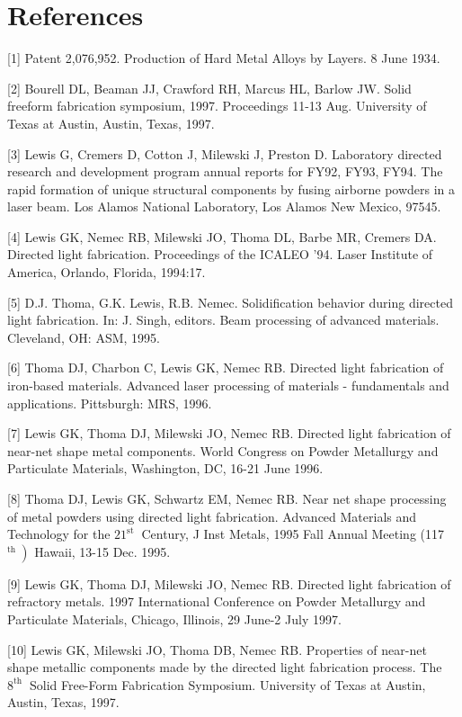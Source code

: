 \documentclass[10pt]{article}
\begin{document}
\section*{References}
[1] Patent 2,076,952. Production of Hard Metal Alloys by Layers. 8 June 1934.

[2] Bourell DL, Beaman JJ, Crawford RH, Marcus HL, Barlow JW. Solid freeform fabrication symposium, 1997. Proceedings 11-13 Aug. University of Texas at Austin, Austin, Texas, 1997.

[3] Lewis G, Cremers D, Cotton J, Milewski J, Preston D. Laboratory directed research and development program annual reports for FY92, FY93, FY94. The rapid formation of unique structural components by fusing airborne powders in a laser beam. Los Alamos National Laboratory, Los Alamos New Mexico, 97545.

[4] Lewis GK, Nemec RB, Milewski JO, Thoma DL, Barbe MR, Cremers DA. Directed light fabrication. Proceedings of the ICALEO '94. Laser Institute of America, Orlando, Florida, 1994:17.

[5] D.J. Thoma, G.K. Lewis, R.B. Nemec. Solidification behavior during directed light fabrication. In: J. Singh, editors. Beam processing of advanced materials. Cleveland, OH: ASM, 1995.

[6] Thoma DJ, Charbon C, Lewis GK, Nemec RB. Directed light fabrication of iron-based materials. Advanced laser processing of materials - fundamentals and applications. Pittsburgh: MRS, 1996.

[7] Lewis GK, Thoma DJ, Milewski JO, Nemec RB. Directed light fabrication of near-net shape metal components. World Congress on Powder Metallurgy and Particulate Materials, Washington, DC, 16-21 June 1996.

[8] Thoma DJ, Lewis GK, Schwartz EM, Nemec RB. Near net shape processing of metal powders using directed light fabrication. Advanced Materials and Technology for the $21^{\text {st }}$ Century, J Inst Metals, 1995 Fall Annual Meeting (117 $\left.{ }^{\text {th }}\right)$ Hawaii, 13-15 Dec. 1995.

[9] Lewis GK, Thoma DJ, Milewski JO, Nemec RB. Directed light fabrication of refractory metals. 1997 International Conference on Powder Metallurgy and Particulate Materials, Chicago, Illinois, 29 June-2 July 1997.

[10] Lewis GK, Milewski JO, Thoma DB, Nemec RB. Properties of near-net shape metallic components made by the directed light fabrication process. The $8^{\text {th }}$ Solid Free-Form Fabrication Symposium. University of Texas at Austin, Austin, Texas, 1997.
\end{document}
